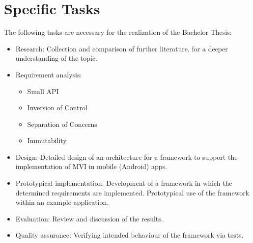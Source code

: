 \section{Specific Tasks}
\label{sec:specific-tasks}

The following tasks are necessary for the realization of the Bachelor Thesis:
%
\begin{itemize}
    \item Research: Collection and comparison of further literature, for a deeper understanding of the topic.
    \item Requirement analysis:
        \begin{itemize}
        	\item Small API 
        	\item Inversion of Control
        	\item Separation of Concerns
        	\item Immutability
        \end{itemize}
    \item Design: Detailed design of an architecture for a framework to support the implementation of MVI in mobile (Android) apps.
    \item Prototypical implementation: Development of a framework in which the determined requirements are implemented.
    Prototypical use of the framework within an example application.
    \item Evaluation: Review and discussion of the results.
    \item Quality assurance: Verifying intended behaviour of the framework via tests.
\end{itemize}